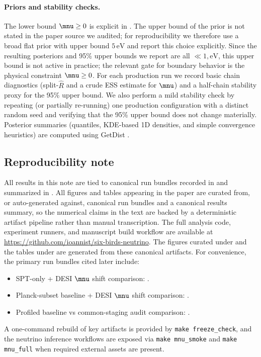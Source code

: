 \paragraph{Priors and stability checks.}
The lower bound $\mnu\ge 0$ is explicit in \cite{arxiv2601_16277}. The upper bound of the prior is not stated in the paper source we audited; for reproducibility we therefore use a broad flat prior with upper bound $5\,\mathrm{eV}$ and report this choice explicitly. Since the resulting posteriors and 95\% upper bounds we report are all $\ll 1,\mathrm{eV}$, this upper bound is not active in practice; the relevant gate for boundary behavior is the physical constraint $\mnu\ge 0$. For each production run we record basic chain diagnostics (split-$\hat R$ \cite{gelman_rubin1992,vehtari2021_rhat} and a crude ESS estimate \cite{vehtari2021_rhat} for $\mnu$) and a half-chain stability proxy for the 95\% upper bound. We also perform a mild stability check by repeating (or partially re-running) one production configuration with a distinct random seed and verifying that the 95\% upper bound does not change materially.
Posterior summaries (quantiles, KDE-based 1D densities, and simple convergence heuristics) are computed using GetDist \cite{getdist}.

\subsection{Reproducibility note}
\label{sec:reproducibility}

All results in this note are tied to canonical run bundles recorded in  and summarized in .
All figures and tables appearing in the paper are curated from, or auto-generated against, canonical run bundles and a canonical results summary, so the numerical claims in the text are backed by a deterministic artifact pipeline rather than manual transcription.
The full analysis code, experiment runners, and manuscript build workflow are available at \url{https://github.com/ioannist/six-birds-neutrino}.
The figures curated under  and the tables under  are generated from these canonical artifacts. For convenience, the primary run bundles cited later include:
\begin{itemize}[leftmargin=*, itemsep=2pt]
  \item SPT-only + DESI $\mnu$ shift comparison: .
  \item Planck-subset baseline + DESI $\mnu$ shift comparison: .
  \item Profiled baseline vs common-staging audit comparison: .
\end{itemize}
A one-command rebuild of key artifacts is provided by \texttt{make freeze\_check}, and the neutrino inference workflows are exposed via \texttt{make mnu\_smoke} and \texttt{make mnu\_full} when required external assets are present.
